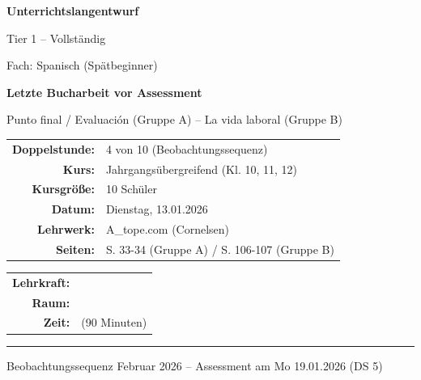\documentclass[11pt, a4paper]{article}
\begin{document}

\thispagestyle{empty}

\begin{center}
    \vspace*{1.5cm}

    {\Large\bfseries Unterrichtslangentwurf}

    \vspace{0.3cm}

    {\large Tier 1 -- Vollständig}

    \vspace{0.5cm}

    {\large Fach: Spanisch (Spätbeginner)}

    \vspace{2cm}

    {\LARGE\bfseries\color{spanisch} Letzte Bucharbeit vor Assessment}

    \vspace{0.3cm}

    {\large Punto final / Evaluación (Gruppe A) -- La vida laboral (Gruppe B)}

    \vspace{2.5cm}

    \begin{tabular}{rl}
        \textbf{Doppelstunde:} & 4 von 10 (Beobachtungssequenz) \\[6pt]
        \textbf{Kurs:} & Jahrgangsübergreifend (Kl. 10, 11, 12) \\[6pt]
        \textbf{Kursgröße:} & 10 Schüler \\[6pt]
        \textbf{Datum:} & Dienstag, 13.01.2026 \\[6pt]
        \textbf{Lehrwerk:} & A\_tope.com (Cornelsen) \\[6pt]
        \textbf{Seiten:} & S. 33-34 (Gruppe A) / S. 106-107 (Gruppe B) \\[6pt]
    \end{tabular}

    \vspace{2cm}

    \begin{tabular}{rl}
        \textbf{Lehrkraft:} & \underline{\hspace{5cm}} \\[6pt]
        \textbf{Raum:} & \underline{\hspace{5cm}} \\[6pt]
        \textbf{Zeit:} & \underline{\hspace{5cm}} (90 Minuten) \\[6pt]
    \end{tabular}

    \vfill

    \hrule
    \vspace{0.3cm}
    {\small\color{grau} Beobachtungssequenz Februar 2026 -- Assessment am Mo 19.01.2026 (DS 5)}

\end{center}
\end{document}
